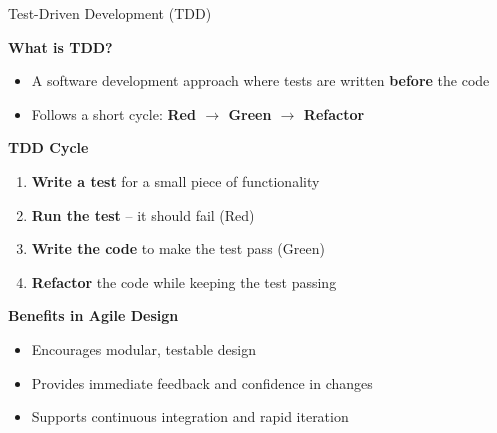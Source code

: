 \begin{frame}{Test-Driven Development (TDD)}
	
	\textbf{What is TDD?}
	\begin{itemize}
		\item A software development approach where tests are written \textbf{before} the code
		\item Follows a short cycle: \textbf{Red $\rightarrow$ Green $\rightarrow$ Refactor}
	\end{itemize}
	\pause
	\vspace{1em}
	\textbf{TDD Cycle}
	\begin{enumerate}
		\item \textbf{Write a test} for a small piece of functionality
		\item \textbf{Run the test} -- it should fail (Red)
		\item \textbf{Write the code} to make the test pass (Green)
		\item \textbf{Refactor} the code while keeping the test passing
	\end{enumerate}
	\pause
	\vspace{1em}
	\textbf{Benefits in Agile Design}
	\begin{itemize}
		\item Encourages modular, testable design
		\item Provides immediate feedback and confidence in changes
		\item Supports continuous integration and rapid iteration
	\end{itemize}
	
\end{frame}

